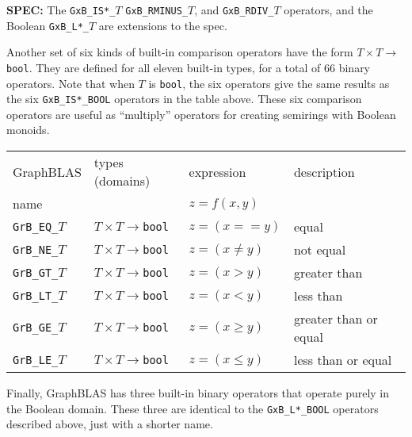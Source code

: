 \documentclass[12pt]{article}
\begin{document}
\begin{spec}
{\bf SPEC:} The \verb'GxB_IS*_'$T$
\verb'GxB_RMINUS_'$T$,
and
\verb'GxB_RDIV_'$T$
operators, and the Boolean \verb'GxB_L*_'$T$ are extensions to the spec.
\end{spec}

Another set of six kinds of built-in comparison operators have the form $T
\times T \rightarrow $\verb'bool'.  They are defined for all eleven built-in
types, for a total of 66 binary operators.  Note that when $T$ is \verb'bool',
the six operators give the same results as the six \verb'GxB_IS*_BOOL'
operators in the table above.  These six comparison operators are useful as
``multiply'' operators for creating semirings with Boolean monoids.

\vspace{0.2in}
{\footnotesize
\begin{tabular}{llll}
\hline
GraphBLAS             & types (domains)            & expression      & description \\
name                  &                            & $z=f(x,y)$      & \\
\hline
\verb'GrB_EQ_'$T$     & $T \times T \rightarrow $\verb'bool' & $z = (x == y)$  & equal \\
\verb'GrB_NE_'$T$     & $T \times T \rightarrow $\verb'bool' & $z = (x \ne y)$ & not equal \\
\verb'GrB_GT_'$T$     & $T \times T \rightarrow $\verb'bool' & $z = (x >   y)$ & greater than \\
\verb'GrB_LT_'$T$     & $T \times T \rightarrow $\verb'bool' & $z = (x <   y)$ & less than  \\
\verb'GrB_GE_'$T$     & $T \times T \rightarrow $\verb'bool' & $z = (x \ge y)$ & greater than or equal \\
\verb'GrB_LE_'$T$     & $T \times T \rightarrow $\verb'bool' & $z = (x \le y)$ & less than or equal  \\
\hline
\end{tabular}
}
\vspace{0.2in}

Finally, GraphBLAS has three built-in binary operators that operate purely in
the Boolean domain.  These three are identical to the \verb'GxB_L*_BOOL'
operators described above, just with a shorter name.
\end{document}
